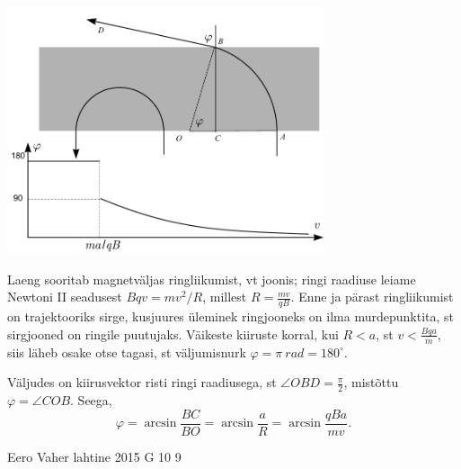 \documentclass[11pt, twoside]{article}
\begin{document}
{{\ifSolution
\begin{center}
\includegraphics[width=0.7\textwidth]{2015-v2g-09-magnetvalilah}
\end{center}
Laeng sooritab magnetväljas ringliikumist, vt joonis;
ringi raadiuse leiame Newtoni II seadusest $Bqv=mv^2/R$, millest
$R=\frac{mv}{qB}$. Enne ja pärast ringliikumist on trajektooriks sirge, kusjuures üleminek ringjooneks on ilma murdepunktita, st sirgjooned on ringile puutujaks. Väikeste kiiruste korral, kui $R<a$, st $v<\frac{Bqa}{m}$, siis läheb osake otse tagasi,
st väljumisnurk $\varphi=\pi \SI{}{rad}=180^\circ$.

Väljudes on kiirusvektor risti ringi raadiusega, st $\angle OBD=\frac \pi 2$, mistõttu $\varphi=\angle COB$. Seega,
\[
\varphi=\arcsin \frac{BC}{BO}=\arcsin \frac{a}{R}=\arcsin \frac{qBa}{mv}.
\]
\fi
}

{Eero Vaher} %
{lahtine} %
{2015} %
{G 10} %
{9} %
{

}}
\end{document}
